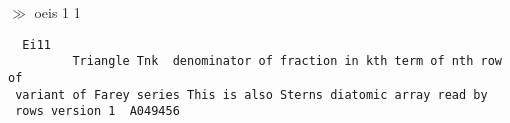 \documentclass[leqno,fleqn,12pt]{article}
\def\prompt#1{\noindent$\gg$ #1}
\begin{document}
\medskip
\prompt{oeis 1 1}
\noindent\begin{tabbing}\tt
~Ei11\\
\tt ~~~~~~~~~Triangle~Tnk~~denominator~of~fraction~in~kth~term~of~nth~row~of\\
\tt ~variant~of~Farey~series~This~is~also~Sterns~diatomic~array~read~by\\
\tt ~rows~version~1~~A049456~
\end{tabbing}





\end{document}
